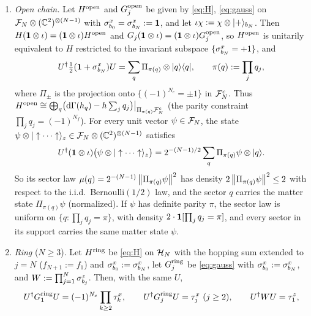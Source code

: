 \begin{proposition}\label{prop:variants}
\leavevmode
\begin{enumerate}[label=(\roman*)]
\item \emph{Open chain.}  Let $H^{\rm open}$ and $G^{\rm open}_j$ be given by \eqref{eq:H},
\eqref{eq:gauss} on $\mathcal{F}_N\otimes(\mathbb{C}^2)^{\otimes(N-1)}$ with $\sigma^{x}_{b_{0}}=\sigma^{x}_{b_{N}}:=\mathbf{1}$, and let
$\iota\chi:=\chi\otimes|+\rangle_{b_N}$.  Then $H(\mathbf{1}\otimes\iota)=(\mathbf{1}\otimes\iota)H^{\rm open}$ and
$G_j(\mathbf{1}\otimes\iota)=(\mathbf{1}\otimes\iota)G_j^{\rm open}$, so $H^{\rm open}$ is unitarily equivalent to
$H$ restricted to the invariant subspace $\{\sigma^{x}_{b_{N}}=+1\}$, and
\begin{equation}\label{eq:openparity}
  U^\dagger\tfrac12(\mathbf{1}+\sigma^{x}_{b_{N}})U=\sum_q\Pi_{\pi(q)}\otimes|q\rangle\langle q|,\qquad\pi(q):=\prod_{j}q_j,
\end{equation}
where $\Pi_{\pm}$ is the projection onto $\{(-1)^{N_c}=\pm1\}$ in $\mathcal{F}^c_N$.  Thus
$H^{\rm open}\cong\bigoplus_q\bigl(\mathrm{d}\Gamma(h_{q})-h\sum_jq_j\bigr)\big|_{\Pi_{\pi(q)}\mathcal{F}^c_N}$ (the
parity constraint $\prod_jq_j=(-1)^{N_f}$).  For every unit vector $\psi\in\mathcal{F}_N$, the state
$\psi\otimes|\uparrow\cdots\uparrow\rangle_z\in\mathcal{F}_N\otimes(\mathbb{C}^2)^{\otimes(N-1)}$ satisfies
\begin{equation}\label{eq:openinit}
  U^\dagger(\mathbf{1}\otimes\iota)\bigl(\psi\otimes|\uparrow\cdots\uparrow\rangle_z\bigr)
  =2^{-(N-1)/2}\sum_q\Pi_{\pi(q)}\psi\otimes|q\rangle.
\end{equation}
So its sector law $\mu(q)=2^{-(N-1)}\left\|\Pi_{\pi(q)}\psi\right\|^2$ has density
$2\left\|\Pi_{\pi(q)}\psi\right\|^2\le2$ with respect to the i.i.d.\ Bernoulli$(1/2)$ law, and the sector $q$
carries the matter state $\Pi_{\pi(q)}\psi$ (normalized).  If $\psi$ has definite parity $\pi$, the sector
law is uniform on $\{q:\prod_jq_j=\pi\}$, with density $2\cdot\mathbf{1}[\prod_jq_j=\pi]$, and every sector in
its support carries the same matter state $\psi$.
\item \emph{Ring} ($N\ge3$).  Let $H^{\rm ring}$ be \eqref{eq:H} on $\mathcal{H}_N$ with the hopping sum
extended to $j=N$ ($f_{N+1}:=f_1$) and $\sigma^{x}_{b_{0}}:=\sigma^{x}_{b_{N}}$, let $G^{\rm ring}_j$ be \eqref{eq:gauss}
with $\sigma^{x}_{b_{0}}:=\sigma^{x}_{b_{N}}$, and $W:=\prod_{j=1}^N\sigma^{z}_{b_{j}}$.  Then, with the same $U$,
\begin{gather*}
  U^\dagger G^{\rm ring}_1U=(-1)^{N_c}\prod_{k\ge2}\taux{k},\qquad U^\dagger G^{\rm ring}_jU=\taux{j}\ (j\ge2),
  \qquad U^\dagger WU=\tauz{1},\\
  \begin{aligned}

\end{aligned}
\end{gather*}
\end{enumerate}
\end{proposition}
